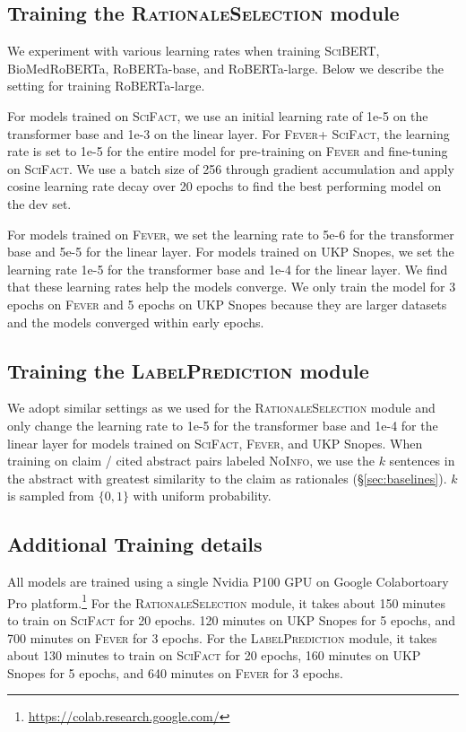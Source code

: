 \documentclass[11pt,a4paper]{article}
\newcommand{\ours}{\textsc{SciFact}\xspace}
\newcommand{\fever}{\textsc{Fever}\xspace}
\newcommand{\snopes}{UKP Snopes\xspace}
\newcommand{\notenough}{\textsc{NoInfo}\xspace}
\newcommand{\scibert}{\textsc{SciBERT}\xspace}
\newcommand{\bioroberta}{BioMedRoBERTa\xspace }
\newcommand{\robertabase}{RoBERTa-base\xspace}
\newcommand{\robertalarge}{RoBERTa-large\xspace}
\newcommand{\componenttwo}{\textsc{RationaleSelection}\xspace}
\newcommand{\componentthree}{\textsc{LabelPrediction}\xspace}
\begin{document}
\subsection{Training the \componenttwo module}

We experiment with various learning rates when training \scibert, \bioroberta, \robertabase, and \robertalarge. Below we describe the setting for training \robertalarge.

For models trained on \ours, we use an initial learning rate of 1e-5 on the transformer base and 1e-3 on the linear layer. For \fever + \ours, the learning rate is set to 1e-5 for the entire model for pre-training on \fever and fine-tuning on \ours. We use a batch size of 256 through gradient accumulation and apply cosine learning rate decay over 20 epochs to find the best performing model on the dev set.

For models trained on \fever, we set the learning rate to 5e-6 for the transformer base and 5e-5 for the linear layer. For models trained on \snopes, we set the learning rate 1e-5 for the transformer base and 1e-4 for the linear layer. We find that these learning rates help the models converge. We only train the model for 3 epochs on \fever and 5 epochs on \snopes because they are larger datasets and the models converged within early epochs.



\subsection{Training the \componentthree module}

We adopt similar settings as we used for the \componenttwo module and only change the learning rate to 1e-5 for the transformer base and 1e-4 for the linear layer for models trained on \ours, \fever, and \snopes. When training on claim / cited abstract pairs labeled \notenough, we use the $k$ sentences in the abstract with greatest similarity to the claim as rationales (\S\ref{sec:baselines}). $k$ is sampled from $\{0, 1\}$ with uniform probability.




\subsection{Additional Training details}

All models are trained using a single Nvidia P100 GPU on Google Colabortoary Pro platform.\footnote{\url{https://colab.research.google.com/}} For the \componenttwo module, it takes about 150 minutes to train on \ours for 20 epochs. 120 minutes on \snopes for 5 epochs, and 700 minutes on \fever for 3 epochs. For the \componentthree module, it takes about 130 minutes to train on \ours for 20 epochs, 160 minutes on \snopes for 5 epochs, and 640 minutes on \fever for 3 epochs.
\end{document}
